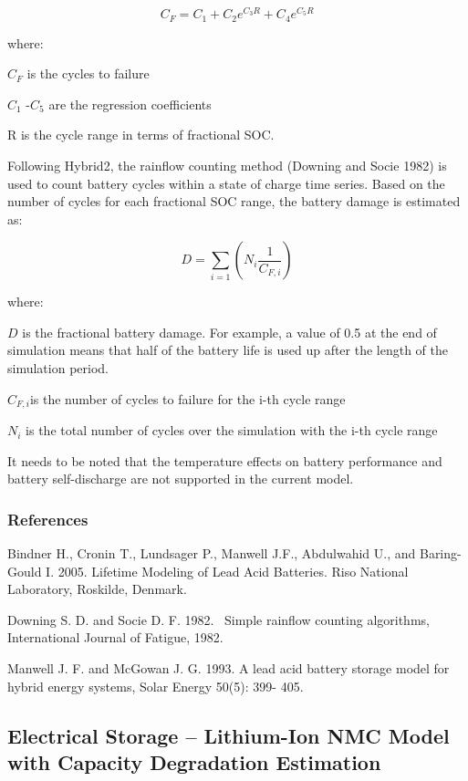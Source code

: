 \begin{equation}
{C_F} = {C_1} + {C_2}{e^{{C_3}R}} + {C_4}{e^{{C_5}R}}
\end{equation}

where:

\({C_F}\) is the cycles to failure

\({C_1}\) -\({C_5}\) are the regression coefficients

R is the cycle range in terms of fractional SOC.

Following Hybrid2, the rainflow counting method (Downing and Socie 1982) is used to count battery cycles within a state of charge time series. Based on the number of cycles for each fractional SOC range, the battery damage is estimated as:

\begin{equation}
D = \sum\limits_{i = 1}^{} {\left( {{N_i}\frac{1}{{{C_{F,i}}}}} \right)}
\end{equation}

where:

\(D\) is the fractional battery damage. For example, a value of 0.5 at the end of simulation means that half of the battery life is used up after the length of the simulation period.

\({C_{F,i}}\)is the number of cycles to failure for the i-th cycle range

\({N_i}\) is the total number of cycles over the simulation with the i-th cycle range

It needs to be noted that the temperature effects on battery performance and battery self-discharge are not supported in the current model.

\subsubsection{References}\label{references-021}

Bindner H., Cronin T., Lundsager P., Manwell J.F., Abdulwahid U., and Baring-Gould I. 2005. Lifetime Modeling of Lead Acid Batteries. Riso National Laboratory, Roskilde, Denmark.

Downing S. D. and Socie D. F. 1982.~ Simple rainflow counting algorithms, International Journal of Fatigue, 1982.

Manwell J. F. and McGowan J. G. 1993. A lead acid battery storage model for hybrid energy systems, Solar Energy 50(5): 399- 405.

\subsection{Electrical Storage – Lithium-Ion NMC Model with Capacity Degradation Estimation
}

